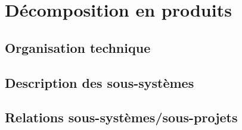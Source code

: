\section{Décomposition en produits}

\subsection{Organisation technique}

\subsection{Description des sous-systèmes}

\subsection{Relations sous-systèmes/sous-projets}
